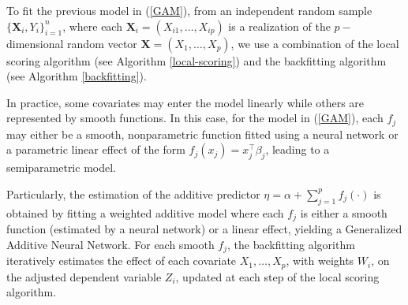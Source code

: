 \begin{table}[ht!]
\centering
{}
\caption{Adjusted dependent variable $Z_i$, weights $W_i$, and deviance $DEV_i(Y_i,\hat\mu_i)$, at the local scoring algorithm for Gaussian, binomial and Poisson distributions \citep{hastie1990tibshirani}.}
\label{dist-link}
\end{table}

To fit the previous model in (\ref{GAM}), from an independent random sample $\{\boldsymbol{X}_i, Y_i\}_{i=1}^n$, where each $\boldsymbol{X}_i = (X_{i1}, \ldots, X_{ip})$ is a realization of the $p-$dimensional random vector 
$\mathbf{X} = (X_1, \ldots, X_p)$, we use a combination of the local scoring algorithm (see Algorithm \ref{local-scoring}) and the backfitting algorithm (see Algorithm \ref{backfitting}).

In practice, some covariates may enter the model linearly while others are represented by smooth functions. In this case, for the model in (\ref{GAM}), each $f_j$ may either be a smooth, nonparametric function fitted using a neural network or a parametric linear effect of the form $f_j(x_j)=x_j^\top \beta_j$, leading to a semiparametric model.

Particularly, the estimation of the additive predictor $\eta = \alpha + \sum_{j=1}^{p} f_j (\cdot)$ is obtained by fitting a weighted additive model where each $f_j$ is either a smooth function (estimated by a neural network) or a linear effect, yielding a Generalized Additive Neural Network. For each smooth $f_j$, the backfitting algorithm iteratively estimates the effect of each covariate $X_1, \ldots, X_p$, with weights $W_i$, on the adjusted dependent variable $Z_i$, updated at each step of the local scoring algorithm. %

